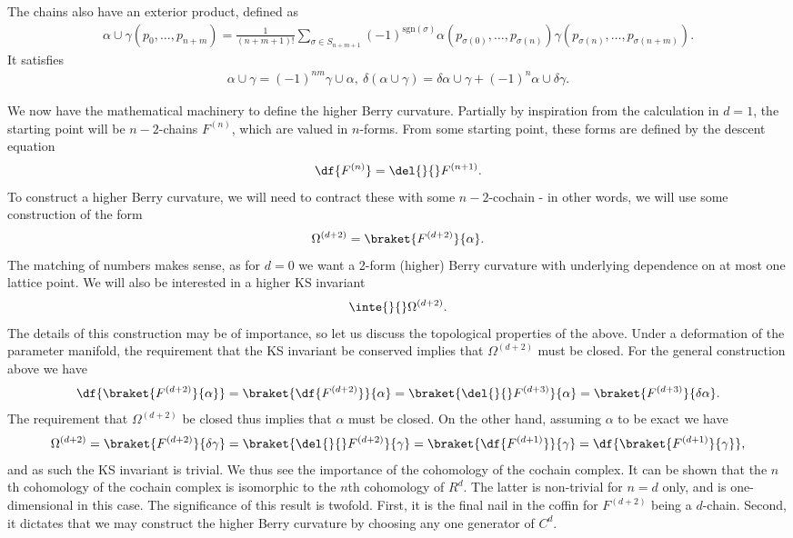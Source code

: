 The chains also have an exterior product, defined as
\begin{align*}
	\alpha\cup\gamma(p_{0}, \dots, p_{n + m}) = \frac{1}{(n + m + 1)!}\sum\limits_{\sigma\in S_{n + m + 1}}(-1)^{\text{sgn}(\sigma)}\alpha(p_{\sigma(0)}, \dots, p_{\sigma(n)})\gamma(p_{\sigma(n)}, \dots, p_{\sigma(n + m)}).
\end{align*}
It satisfies
\begin{align*}
	\alpha\cup\gamma = (-1)^{nm}\gamma\cup\alpha,\ \delta(\alpha\cup\gamma) = \delta\alpha\cup\gamma + (-1)^{n}\alpha\cup\delta\gamma.
\end{align*}

We now have the mathematical machinery to define the higher Berry curvature. Partially by inspiration from the calculation in $d = 1$, the starting point will be $n - 2$-chains $F^{(n)}$, which are valued in $n$-forms. From some starting point, these forms are defined by the descent equation
\begin{align*}
	\df{F^{(n)}} = \del{}{}F^{(n + 1)}.
\end{align*}
To construct a higher Berry curvature, we will need to contract these with some $n -2$-cochain - in other words, we will use some construction of the form
\begin{align*}
	\Omega^{(d + 2)} = \braket{F^{(d + 2)}}{\alpha}.
\end{align*}
The matching of numbers makes sense, as for $d = 0$ we want a 2-form (higher) Berry curvature with underlying dependence on at most one lattice point. We will also be interested in a higher KS invariant
\begin{align*}
	\inte{}{}\Omega^{(d + 2)}.
\end{align*}
The details of this construction may be of importance, so let us discuss the topological properties of the above. Under a deformation of the parameter manifold, the requirement that the KS invariant be conserved implies that $\Omega^{(d + 2)}$ must be closed. For the general construction above we have
\begin{align*}
	\df{\braket{F^{(d + 2)}}{\alpha}} = \braket{\df{F^{(d + 2)}}}{\alpha} = \braket{\del{}{}F^{(d + 3)}}{\alpha} = \braket{F^{(d + 3)}}{\delta\alpha}.
\end{align*}
The requirement that $\Omega^{(d + 2)}$ be closed thus implies that $\alpha$ must be closed. On the other hand, assuming $\alpha$ to be exact we have
\begin{align*}
	\Omega^{(d + 2)} = \braket{F^{(d + 2)}}{\delta\gamma} = \braket{\del{}{}F^{(d + 2)}}{\gamma} = \braket{\df{F^{(d + 1)}}}{\gamma} = \df{\braket{F^{(d + 1)}}{\gamma}},
\end{align*}
and as such the KS invariant is trivial. We thus see the importance of the cohomology of the cochain complex. It can be shown that the $n$th cohomology of the cochain complex is isomorphic to the $n$th cohomology of $R^{d}$. The latter is non-trivial for $n = d$ only, and is one-dimensional in this case. The significance of this result is twofold. First, it is the final nail in the coffin for $F^{(d + 2)}$ being a $d$-chain. Second, it dictates that we may construct the higher Berry curvature by choosing any one generator of $C^{d}$.

